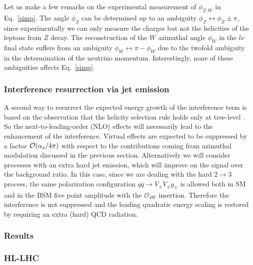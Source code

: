 \documentclass[../report.tex]{subfiles}
\begin{document}
 Let us make a few remarks on the experimental measurement  of $\phi_{Z,W}$ in Eq.~\ref{simp}.
 The angle $\phi_Z$  can be determined up to an ambiguity  $\phi_Z\leftrightarrow \phi_Z \pm \pi$,
 since experimentally we can only measure the charges but not the helicities of the  leptons from $Z$  decay.
 The reconstruction of the $W$  azimuthal  angle $\phi_W$ in the $l\nu$ final state  suffers from an ambiguity  $\phi_W \leftrightarrow \pi-\phi_W$ due to the twofold ambiguity in the determination of the neutrino momentum.
Interestingly, none of these ambiguities  affects  Eq.~\ref{simp}.

\subsubsection*{Interference resurrection via jet emission}
 \label{jetsol}
 
A second way to resurrect the expected energy growth of the 
interference term is based on the observation that the helicity 
selection rule holds only at tree-level \cite{Azatov:2017kzw}. 
So the next-to-leading-order (NLO) effects will necessarily lead to the 
enhancement of the interference.
Virtual effects are expected to be suppressed by a factor ${\cal{O}}( 
\alpha_s/4\pi)$ with respect to the contributions coming from 
azimuthal modulation discussed in the previous section.
Alternatively we will consider processes with an extra hard jet emission, which will improve on the  signal over the  background ratio. 
 In this case,  since   we are dealing with the hard
  $2\to 3$ process,
 the same polarization configuration $q\bar{q}\to V_{\pm}V_{\pm}g_{\mp}$ is allowed both in SM and in the BSM five point amplitude with the $\mathcal{O}_{3W}$ insertion. Therefore the interference is not suppressed and the leading quadratic energy scaling is restored by requiring an extra (hard) QCD radiation.


\subsubsection{Results}
\label{res}

\subsubsection*{HL-LHC}
\end{document}
